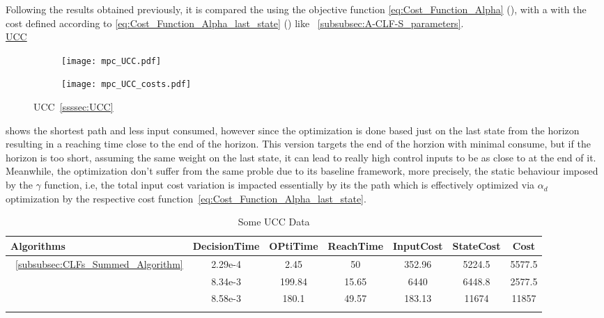 Following the results obtained previously, it is compared the  using the objective function \ref{eq:Cost_Function_Alpha} (), with a  with the cost defined according to \ref{eq:Cost_Function_Alpha_last_state} () like ~\ref{subsubsec:A-CLF-S_parameters}.\\

\underline{UCC}
\label{UCC_other_experiments} %


 \begin{figure}[htbp]
  \begin{subfigure}{0.5\textwidth}
    \centering
    \texttt{[image: mpc\_UCC.pdf]}
  \label{fig:mpc_UCC_CostEvol}
  \end{subfigure}
  \begin{subfigure}{0.6\textwidth}
    \centering
    \texttt{[image: mpc\_UCC\_costs.pdf]}
  \label{fig:mpc_UCC_trajectory}
  \end{subfigure}
  \caption{UCC~\ref{ssssec:UCC}}
\label{fig:mpc_UCCTrajectory_and_CostEvol}
\end{figure}


 shows the shortest path and less input consumed, however since the optimization is done based just on the last state from the horizon resulting in a reaching time close to the end of the horizon. This  version targets the end of the horzion with minimal consume, but if the horizon is too short, assuming the same weight on the last state, it can lead to really high control inputs to be as close to \txtref at the end of it. Meanwhile, the  optimization don't suffer from the same proble due to its baseline framework, more precisely, the static behaviour imposed by the \(\gamma\) function, i.e, the total input cost variation is impacted essentially by its the path which is effectively optimized via \(\alpha_d\) optimization by the respective cost function~\ref{eq:Cost_Function_Alpha_last_state}.

  \bgroup
 \begin{xltabular}{\textwidth}{|l|cccccc|}
   \toprule
   Algorithms   & DecisionTime & OPtiTime & ReachTime  & InputCost   & StateCost & Cost           \\
   \midrule
    ~\ref{subsubsec:CLFs_Summed_Algorithm}        & 2.29e-4 & 2.45 & 50 & 352.96 & 5224.5 & 5577.5 \\
                                                    & 8.34e-3 & 199.84  & 15.65  & 6440  & 6448.8 & 2577.5 \\
                                                    & 8.58e-3 & 180.1 & 49.57 & 183.13  & 11674  & 11857 \\
    \midrule
    \caption{Some UCC Data}
    \label{tab:Some_mpc_UCC_Data}\\
   \end{xltabular}
 \egroup


